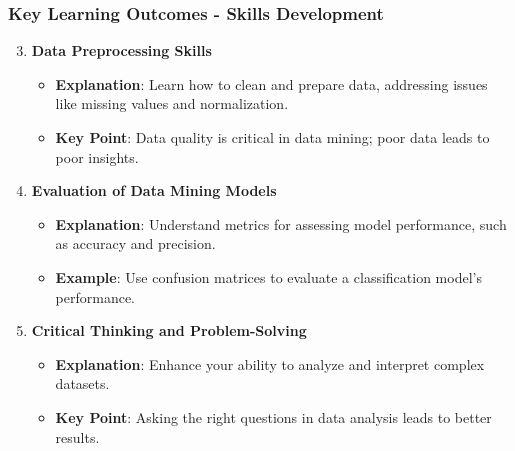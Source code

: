 \documentclass[aspectratio=169]{beamer}
\begin{document}
\begin{frame}[fragile]
    \frametitle{Key Learning Outcomes - Skills Development}
    \begin{enumerate}
        \setcounter{enumi}{2} %
        \item \textbf{Data Preprocessing Skills}  
          \begin{itemize}
              \item \textbf{Explanation}: Learn how to clean and prepare data, addressing issues like missing values and normalization.
              \item \textbf{Key Point}: Data quality is critical in data mining; poor data leads to poor insights.
          \end{itemize}
          
        \item \textbf{Evaluation of Data Mining Models}  
          \begin{itemize}
              \item \textbf{Explanation}: Understand metrics for assessing model performance, such as accuracy and precision.
              \item \textbf{Example}: Use confusion matrices to evaluate a classification model’s performance.
          \end{itemize}
          
        \item \textbf{Critical Thinking and Problem-Solving}  
          \begin{itemize}
              \item \textbf{Explanation}: Enhance your ability to analyze and interpret complex datasets.
              \item \textbf{Key Point}: Asking the right questions in data analysis leads to better results.
          \end{itemize}
    \end{enumerate}
\end{frame}
\end{document}
